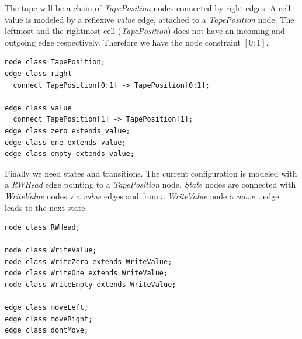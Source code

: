 \documentclass[a4paper,11pt]{report}
\begin{document}
The tape will be a chain of \emph{TapePosition} nodes connected by right edges. A cell value is modeled by a reflexive \emph{value} edge, attached to a \emph{TapePosition} node. The leftmost and the rightmost cell (\emph{TapePosition}) does not have an incoming and outgoing edge respectively. Therefore we have the node constraint $[0:1]$.
\lstset{language=grgenmodel}
\begin{lstlisting}[name=gr]
node class TapePosition; 
edge class right
  connect TapePosition[0:1] -> TapePosition[0:1];
  
edge class value
  connect TapePosition[1] -> TapePosition[1];  
edge class zero extends value;
edge class one extends value;
edge class empty extends value;  
\end{lstlisting}
Finally we need states and transitions. The current configuration is modeled with a \emph{RWHead} edge pointing to a \emph{TapePosition} node. \emph{State} nodes are connected with \emph{WriteValue} nodes via \emph{value} edges and from a \emph{WriteValue} node a \emph{move\dots} edge leads to the next state.
\begin{lstlisting}[name=gr]
node class RWHead;

node class WriteValue;
node class WriteZero extends WriteValue;
node class WriteOne extends WriteValue;
node class WriteEmpty extends WriteValue; 

edge class moveLeft;
edge class moveRight;
edge class dontMove;
\end{lstlisting}
\end{document}
